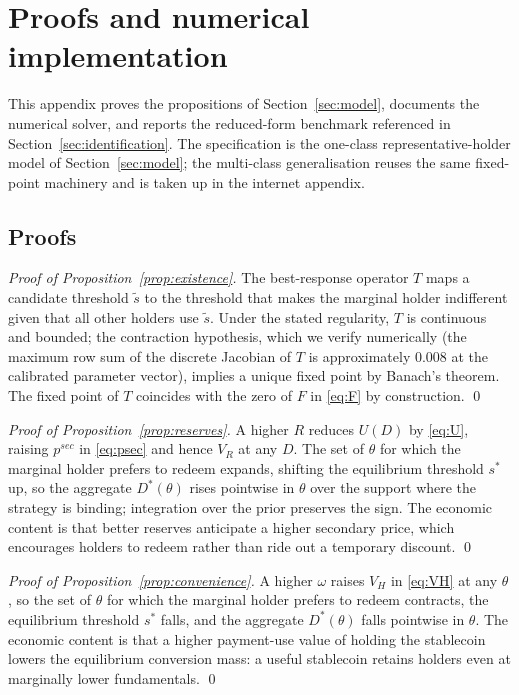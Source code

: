 \section{Proofs and numerical implementation}\label{app:proofs}\label{app:formal_model}

This appendix proves the propositions of Section~\ref{sec:model}, documents the numerical solver, and reports the reduced-form benchmark referenced in Section~\ref{sec:identification}. The specification is the one-class representative-holder model of Section~\ref{sec:model}; the multi-class generalisation reuses the same fixed-point machinery and is taken up in the internet appendix.

\subsection{Proofs}\label{app:proof_block}

\begin{proof}[Proof of Proposition~\ref{prop:existence}]
The best-response operator $T$ maps a candidate threshold $\tilde s$ to the threshold that makes the marginal holder indifferent given that all other holders use $\tilde s$. Under the stated regularity, $T$ is continuous and bounded; the contraction hypothesis, which we verify numerically (the maximum row sum of the discrete Jacobian of $T$ is approximately $0.008$ at the calibrated parameter vector), implies a unique fixed point by Banach's theorem. The fixed point of $T$ coincides with the zero of $F$ in \eqref{eq:F} by construction. \qed
\end{proof}

\begin{proof}[Proof of Proposition~\ref{prop:reserves}]
A higher $R$ reduces $U(D)$ by \eqref{eq:U}, raising $p^{sec}$ in \eqref{eq:psec} and hence $V_R$ at any $D$. The set of $\theta$ for which the marginal holder prefers to redeem expands, shifting the equilibrium threshold $s^*$ up, so the aggregate $D^*(\theta)$ rises pointwise in $\theta$ over the support where the strategy is binding; integration over the prior preserves the sign. The economic content is that better reserves anticipate a higher secondary price, which encourages holders to redeem rather than ride out a temporary discount. \qed
\end{proof}

\begin{proof}[Proof of Proposition~\ref{prop:convenience}]
A higher $\omega$ raises $V_H$ in \eqref{eq:VH} at any $\theta$, so the set of $\theta$ for which the marginal holder prefers to redeem contracts, the equilibrium threshold $s^*$ falls, and the aggregate $D^*(\theta)$ falls pointwise in $\theta$. The economic content is that a higher payment-use value of holding the stablecoin lowers the equilibrium conversion mass: a useful stablecoin retains holders even at marginally lower fundamentals. \qed
\end{proof}

